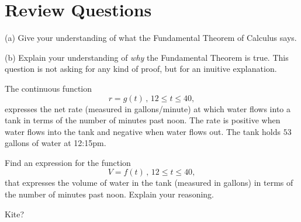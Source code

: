 \documentclass{ximera}
\begin{document}
\section*{Review Questions}

\begin{question}  \label{Qdfdsftt5466544}
(a) Give your understanding of what the Fundamental Theorem of Calculus says.

(b) Explain your understanding of \emph{why} the Fundamental Theorem is true. This question is not asking for any kind of proof, but for an inuitive explanation.
\end{question}


\begin{question}  \label{Q45rfdg55}
The continuous function
\[
  r = g(t) \, ,  \, 12 \leq t \leq 40,
\]
expresses the net rate (measured in gallons/minute) at which water flows into a tank in terms of the number of minutes past noon. The rate is positive when water flows into the tank and negative when water flows out. The tank holds $53$ gallons of water at 12:15pm.

Find an expression for the function
\[
    V = f(t)\, ,  \, 12 \leq t \leq 40,
\]
that expresses the volume of water in the tank (measured in gallons) in terms of the number of minutes past noon. Explain your reasoning.

\end{question}

\begin{question}  \label{Q5434g54t5t}
Kite?

\end{question}
\end{document}
